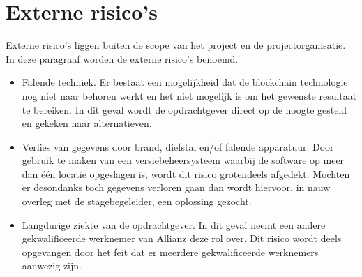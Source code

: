 \section{Externe risico's}
Externe risico's liggen buiten de scope van het project en de projectorganisatie. In deze paragraaf worden de externe risico's benoemd.\par
\begin{itemize}
\item Falende techniek. Er bestaat een mogelijkheid dat de blockchain technologie nog niet naar behoren werkt en het niet mogelijk is om het gewenste resultaat te bereiken. In dit geval wordt de opdrachtgever direct op de hoogte gesteld en gekeken naar alternatieven.
\item Verlies van gegevens door brand, diefstal en/of falende apparatuur. Door gebruik te maken van een versiebeheersysteem waarbij de software op meer dan één locatie opgeslagen is, wordt dit risico grotendeels afgedekt. Mochten er desondanks toch gegevens verloren gaan dan wordt hiervoor, in nauw overleg met de stagebegeleider, een oplossing gezocht.
\item Langdurige ziekte van de opdrachtgever. In dit geval neemt een andere gekwalificeerde werknemer van Allianz deze rol over. Dit risico wordt deels opgevangen door het feit dat er meerdere gekwalificeerde werknemers aanwezig zijn.
\end{itemize}
